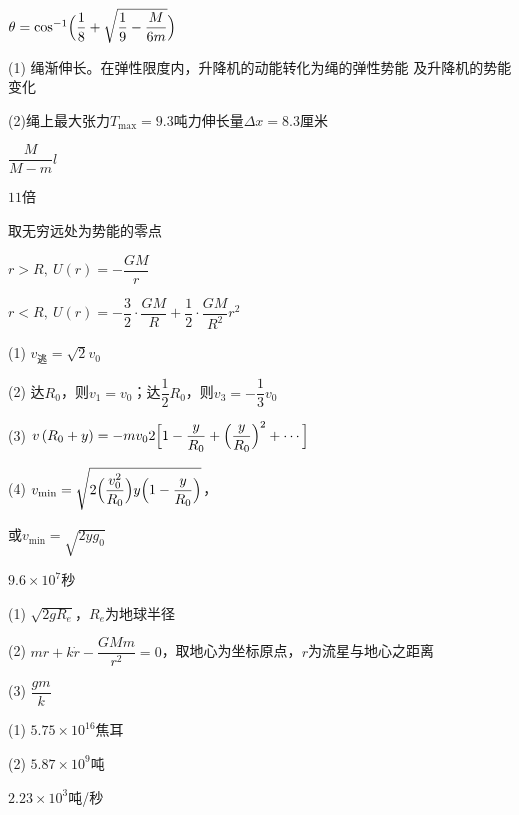 \documentclass[../outline-of-mechanics.tex]{subfiles}
\begin{document}
\clearpage
\answer $ \theta = \cos ^ { - 1 } \Bigl( \dfrac { 1 } { 8 } + \sqrt { \dfrac { 1 } { 9 } - \dfrac { M } { 6 m } } \Bigr) $

\answer (1) 绳渐伸长。在弹性限度内，升降机的动能转化为绳的弹性势能
及升降机的势能变化

(2)绳上最大张力$ T_\text{max}=9.3 $吨力伸长量$ \Delta x = 8 . 3 $厘米

\answer $ \dfrac { M } { M - m } l $

\answer $ 11 $倍

\answer 取无穷远处为势能的零点

$ r > R,~ U \left( r \right) = - \dfrac { G M } { r }$

$ r < R,~ U \left( r \right) = - \dfrac { 3 } { 2 } \cdot \dfrac { G M } { R } + \dfrac { 1 } { 2 } \cdot \dfrac { G M } { R ^ { 2 } } r ^ { 2 } $

\answer (1) $ v _ \text{逃} = \sqrt { 2 } v _ { 0 } $

(2) 达$ R_0 $，则$ v _ { 1 } = v _ { 0 } $；达$ \dfrac { 1 } { 2 } R _ { 0 } $，则$ v _ { 3 } = - \dfrac { 1 } { 3 } v _ { 0 } $

(3) $v\left(R_{0}+y\right)=-m v_{0} 2\Bigl[1-\dfrac{y}{R_{0}}+\Bigl(\dfrac{y}{R_{0}}\Bigr)^{2}+\cdots\Bigr]$

(4) $v_{\text{min}}=\sqrt{2\Bigl(\dfrac{v_{0}^{2}}{R_{0}}\Bigr) y\Bigl(1-\dfrac{y}{R_{0}}\Bigr)}$，

或$v_{\text{min}} = \sqrt { 2 y g _ { 0 } } $

\answer $ 9 . 6 \times 1 0 ^ { 7 } $秒

\answer (1) $ \sqrt { 2 g R _ { e } } $，$ R_e $为地球半径

(2) $ m r + k \dot{r} - \dfrac { G M m } { r ^ { 2 } } = 0 $，取地心为坐标原点，$ r $为流星与地心之距离

(3) $ \dfrac{g m}{k} $

\answer (1) $ 5 . 7 5 \times 1 0 ^ { 16 } $焦耳

(2) $ 5.87\times 10 ^9 $吨

\answer $ 2 . 2 3 \times 1 0 ^ { 3 } $吨/秒
\end{document}

